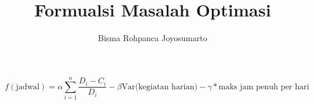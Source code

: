\documentclass{article}
\title{Formualsi Masalah Optimasi}
\author{Bisma Rohpanca Joyosumarto}
\date{}
\begin{document}
$$f(\text{jadwal}) = \alpha \sum_{i=1}^n \frac{D_i - C_i}{D_i} - \beta \text{Var(kegiatan harian)} - \gamma * \text{maks jam penuh per hari}$$
\end{document}

